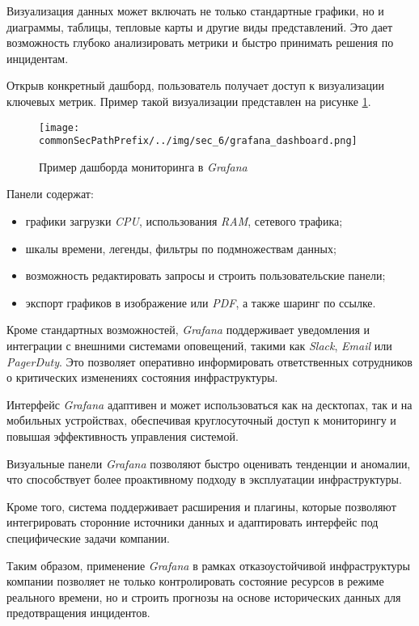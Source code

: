 Визуализация данных может включать не только стандартные графики, но и диаграммы, таблицы, тепловые карты и другие виды представлений. Это дает возможность глубоко анализировать метрики и быстро принимать решения по инцидентам.

Открыв конкретный дашборд, пользователь получает доступ к визуализации ключевых метрик. Пример такой визуализации представлен на рисунке \ref{fig:user_guide:grafana_dashboard}.

\begin{figure}[ht]
    \centering
    \texttt{[image: \\commonSecPathPrefix/../img/sec\_6/grafana\_dashboard.png]}
    \caption{Пример дашборда мониторинга в \textit{Grafana}}
    \label{fig:user_guide:grafana_dashboard}
\end{figure}

Панели содержат:
\begin{itemize}
    \item графики загрузки \textit{CPU}, использования \textit{RAM}, сетевого трафика;
    \item шкалы времени, легенды, фильтры по подмножествам данных;
    \item возможность редактировать запросы и строить пользовательские панели;
    \item экспорт графиков в изображение или \textit{PDF}, а также шаринг по ссылке.
\end{itemize}

Кроме стандартных возможностей, \textit{Grafana} поддерживает уведомления и интеграции с внешними системами оповещений, такими как \textit{Slack}, \textit{Email} или \textit{PagerDuty}. Это позволяет оперативно информировать ответственных сотрудников о критических изменениях состояния инфраструктуры.

Интерфейс \textit{Grafana} адаптивен и может использоваться как на десктопах, так и на мобильных устройствах, обеспечивая круглосуточный доступ к мониторингу и повышая эффективность управления системой.

Визуальные панели \textit{Grafana} позволяют быстро оценивать тенденции и аномалии, что способствует более проактивному подходу в эксплуатации инфраструктуры.

Кроме того, система поддерживает расширения и плагины, которые позволяют интегрировать сторонние источники данных и адаптировать интерфейс под специфические задачи компании.

Таким образом, применение \textit{Grafana} в рамках отказоустойчивой инфраструктуры компании позволяет не только контролировать состояние ресурсов в режиме реального времени, но и строить прогнозы на основе исторических данных для предотвращения инцидентов.


